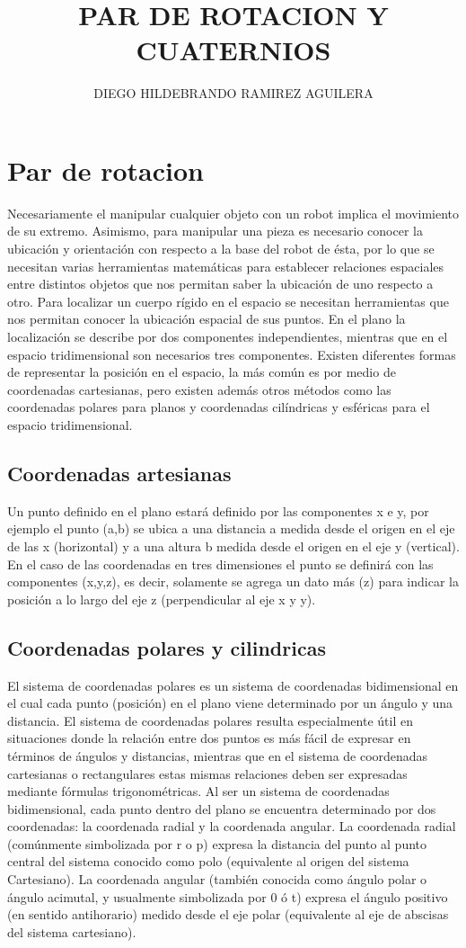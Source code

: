 \documentclass[10pt,a4paper]{article}
\author{DIEGO HILDEBRANDO RAMIREZ AGUILERA}
\title{PAR DE ROTACION Y CUATERNIOS}
\begin{document}
\maketitle
\section{Par de rotacion}
Necesariamente el manipular cualquier objeto con un robot implica el movimiento de su extremo. Asimismo, para manipular una pieza es necesario conocer la ubicación y orientación con respecto a la base del robot de ésta, por lo que se necesitan varias herramientas matemáticas para establecer relaciones espaciales entre distintos objetos que nos permitan saber la ubicación de uno respecto a otro.
Para localizar un cuerpo rígido en el espacio se necesitan herramientas que nos permitan conocer la ubicación espacial de sus puntos. En el plano la localización se describe por dos componentes independientes, mientras que en el espacio tridimensional son necesarios tres componentes. Existen diferentes formas de representar la posición en el espacio, la más común es por medio de coordenadas cartesianas, pero existen además otros métodos como las coordenadas polares para planos y coordenadas cilíndricas y esféricas para el espacio tridimensional.

\subsection{Coordenadas artesianas}
Un punto definido en el plano estará definido por las componentes x e y, por ejemplo el punto (a,b) se ubica a una distancia a medida desde el origen en el eje de las x (horizontal) y a una altura b medida desde el origen en el eje y (vertical). En el caso de las coordenadas en tres dimensiones el punto se definirá con las componentes (x,y,z), es decir, solamente se agrega un dato más (z) para indicar la posición a lo largo del eje z (perpendicular al eje x y y).
\subsection{Coordenadas polares y cilindricas}
El sistema de coordenadas polares es un sistema de coordenadas bidimensional en el cual cada punto (posición) en el plano viene determinado por un ángulo y una distancia. El sistema de coordenadas polares resulta especialmente útil en situaciones donde la relación entre dos puntos es más fácil de expresar en términos de ángulos y distancias, mientras que en el sistema de coordenadas cartesianas o rectangulares estas mismas relaciones deben ser expresadas mediante fórmulas trigonométricas.
Al ser un sistema de coordenadas bidimensional, cada punto dentro del plano se encuentra determinado por dos coordenadas: la coordenada radial y la coordenada angular. La coordenada radial (comúnmente simbolizada por r o p) expresa la distancia del punto al punto central del sistema conocido como polo (equivalente al origen del sistema Cartesiano). La coordenada angular (también conocida como ángulo polar o ángulo acimutal, y usualmente simbolizada por 0 ó t) expresa el ángulo positivo (en sentido antihorario) medido desde el eje polar (equivalente al eje de abscisas del sistema cartesiano).
\end{document}

